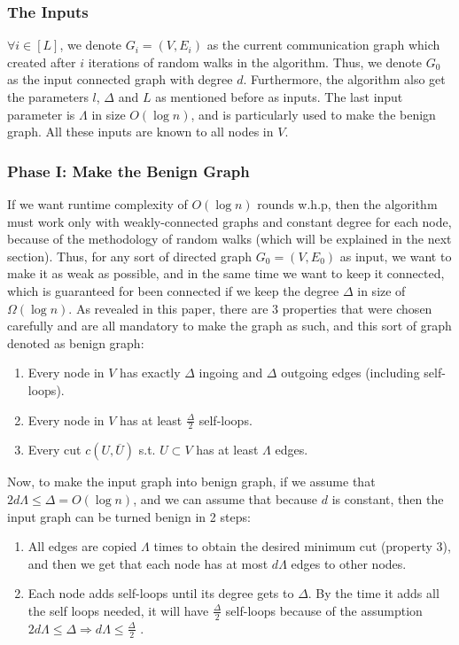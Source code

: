 \documentclass[11pt]{article}
\begin{document}
\subsubsection{The Inputs}
$\forall{i}\in[L]$, we denote $G_{i}=(V,E_{i})$ as the current communication graph which created after $i$ iterations of random walks in the algorithm. Thus, we denote $G_{0}$ as the input connected graph with degree $d$. Furthermore, the algorithm also get the parameters $l$, $\Delta$ and $L$ as mentioned before as inputs. The last input parameter is $\Lambda$ in size $O(\log{n})$, and is particularly used to make the benign graph. All these inputs are known to all nodes in $V$.

\subsubsection{Phase I: Make the Benign Graph}
If we want runtime complexity of $O(\log{n})$ rounds w.h.p, then the algorithm must work only with weakly-connected graphs and constant degree for each node, because of the methodology of random walks (which will be explained in the next section). Thus, for any sort of directed graph $G_{0}=(V,E_{0})$ as input, we want to make it as weak as possible, and in the same time we want to keep it connected, which is guaranteed for been connected if we keep the degree $\Delta$ in size of $\Omega(\log{n})$. As revealed in this paper, there are 3 properties that were chosen carefully and are all mandatory to make the graph as such, and this sort of graph denoted as benign graph:
\begin{enumerate}
  \item Every node in $V$ has exactly $\Delta$ ingoing and $\Delta$ outgoing edges (including self-loops).
  \item Every node in $V$ has at least $\frac{\Delta}{2}$ self-loops.
  \item Every cut $c(U,\overline{U})$ s.t. $U\subset V$ has at least $\Lambda$ edges.
\end{enumerate}
Now, to make the input graph into benign graph, if we assume that $2d\Lambda \leq \Delta = O(\log{n})$, and we can assume that because $d$ is constant, then the input graph can be turned benign in 2 steps:
\begin{enumerate}
  \item All edges are copied $\Lambda$ times to obtain the desired minimum cut (property 3), and then we get that each node has at most $d\Lambda$ edges to other nodes.
  \item Each node adds self-loops until its degree gets to $\Delta$. By the time it adds all the self loops needed, it will have $\frac{\Delta}{2}$ self-loops because of the assumption 
  $2d\Lambda \leq \Delta \Rightarrow d\Lambda \leq \frac{\Delta}{2}$ .
\end{enumerate}
\end{document}
